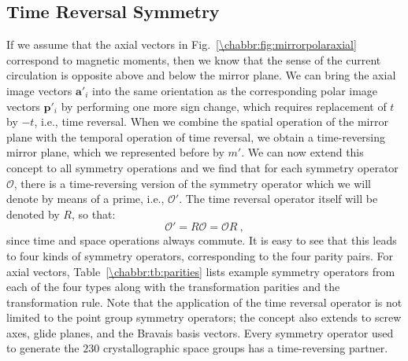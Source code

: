 \subsection{Time Reversal Symmetry}\label{\chabbr:ssec:timereversal}
If we assume that the axial vectors in Fig.~\ref{\chabbr:fig:mirrorpolaraxial} correspond to magnetic moments, then we know that the sense of the current circulation is opposite above and below the mirror plane.  We can bring the axial image vectors $\mathbf{a}'_i$ into the same orientation as the corresponding polar image vectors $\mathbf{p}'_i$ by performing one more sign change, which requires replacement of $t$ by $-t$, i.e., time reversal. When we combine the spatial operation of the mirror plane with the temporal operation of time reversal, we obtain a time-reversing mirror plane, which we represented before by $m'$. We can now extend this concept to all symmetry operations and we find that for each symmetry operator $\mathcal{O}$, there is a time-reversing version of the symmetry operator which we will denote by means of a prime, i.e., $\mathcal{O}'$.  The time reversal operator itself will be denoted by $R$, so that:
\[
	\mathcal{O}' = R\mathcal{O} = \mathcal{O}R\ ,
\]
since time and space operations always commute.  It is easy to see that this leads to four kinds of symmetry operators, corresponding to the four parity pairs.  For axial vectors, Table~\ref{\chabbr:tb:parities} lists example symmetry operators from each of the four types along with the transformation parities and the transformation rule.  Note that the application of the time reversal operator is not limited to the point group symmetry operators; the concept also extends to screw axes, glide planes, and the Bravais basis vectors.  Every symmetry operator used to generate the $230$ crystallographic space groups has a time-reversing partner.

